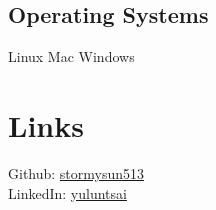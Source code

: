\documentclass[letterpaper]{deedy-resume} %
\begin{document}
\begin{minipage}[t]{0.35\textwidth}
\sectionspace
\subsection{Operating Systems}
Linux \textbullet{} Mac \textbullet{} Windows

\sectionspace %

\section{Links} 

Github: \href{https://github.com/stormysun513}{stormysun513} \\
LinkedIn: \href{https://linkedin.com/in/yuluntsai}{yuluntsai} \\

\sectionspace %


\end{minipage} %
\hfill
%
%
\end{document}
